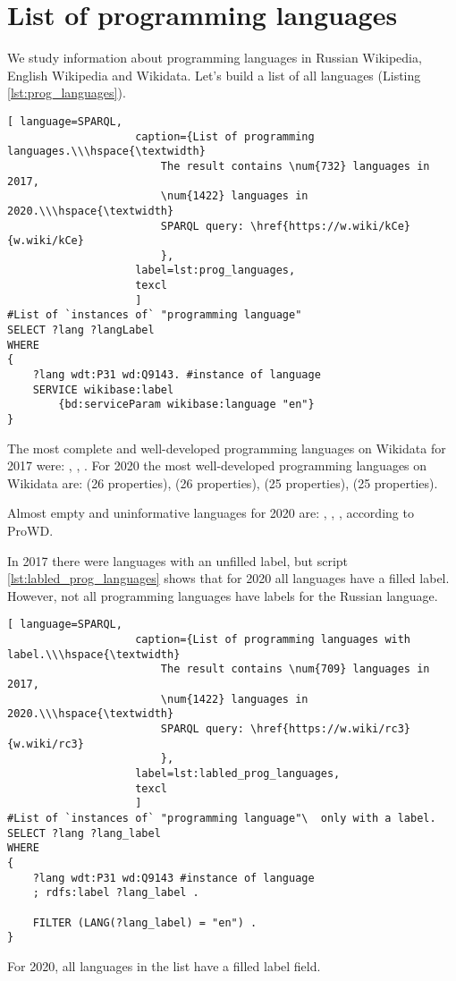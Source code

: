 \section{List of programming languages}
We study information about programming languages in Russian Wikipedia, English Wikipedia and Wikidata. Let's build a list of all languages (Listing \ref{lst:prog_languages}).
\begin{lstlisting}[ language=SPARQL, 
                    caption={List of programming languages.\\\hspace{\textwidth}
                        The result contains \num{732} languages in 2017, 
                        \num{1422} languages in 2020.\\\hspace{\textwidth}
                        SPARQL query: \href{https://w.wiki/kCe}{w.wiki/kCe}
                        },
                    label=lst:prog_languages,
                    texcl 
                    ]
#List of `instances of` "programming language" 
SELECT ?lang ?langLabel
WHERE
{
    ?lang wdt:P31 wd:Q9143. #instance of language
    SERVICE wikibase:label 
		{bd:serviceParam wikibase:language "en"}
}
\end{lstlisting}%

The most complete and well-developed programming languages on Wikidata for 2017 were: , , . For 2020 the most well-developed programming languages on Wikidata are:  (26 properties),  (26 properties),  (25 properties),  (25 properties).

Almost empty and uninformative languages for 2020 are: , , ,  according to ProWD\cite{prowd_langs}.

In 2017 there were languages with an unfilled label, but script \ref{lst:labled_prog_languages} shows that for 2020 all languages have a filled label. However, not all programming languages have labels for the Russian language.

\begin{lstlisting}[ language=SPARQL, 
                    caption={List of programming languages with label.\\\hspace{\textwidth}
                        The result contains \num{709} languages in 2017, 
                        \num{1422} languages in 2020.\\\hspace{\textwidth}
                        SPARQL query: \href{https://w.wiki/rc3}{w.wiki/rc3}
                        },
                    label=lst:labled_prog_languages,
                    texcl 
                    ]
#List of `instances of` "programming language"\  only with a label.
SELECT ?lang ?lang_label
WHERE
{
    ?lang wdt:P31 wd:Q9143 #instance of language
    ; rdfs:label ?lang_label . 

    FILTER (LANG(?lang_label) = "en") . 
}
\end{lstlisting}%
For 2020, all languages in the list have a filled label field.

